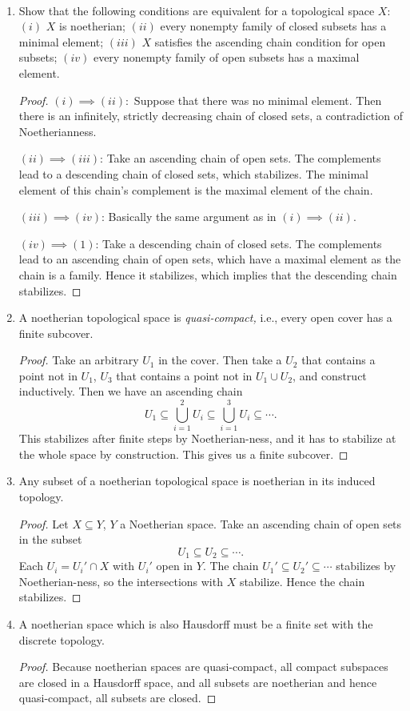 \begin{exercise}%
~
\begin{enumerate}
\item Show that the following conditions are equivalent for a topological space $X$: $(i)$ $X$ is noetherian; $(ii)$ every nonempty family of closed subsets has a minimal element; $(iii)$ $X$ satisfies the ascending chain condition for open subsets; $(iv)$ every nonempty family of open subsets has a maximal element.
\begin{proof}
	$(i)\implies (ii):$ Suppose that there was no minimal element.
	Then there is an infinitely, strictly decreasing chain of closed sets, a contradiction of Noetherianness.

	$(ii) \implies (iii) $: Take an ascending chain of open sets.
	The complements lead to a descending chain of closed sets, which stabilizes.
	The minimal element of this chain's complement is the maximal element of the chain.

	$(iii)\implies (iv) $: Basically the same argument as in $(i)\implies (ii) $.

	$(iv)\implies (1) $: Take a descending chain of closed sets.
	The complements lead to an ascending chain of open sets, which have a maximal element as the chain is a family.
	Hence it stabilizes, which implies that the descending chain stabilizes.
\end{proof}
\item A noetherian topological space is \emph{quasi-compact,} i.e., every open cover has a finite subcover.
\begin{proof}
	Take an arbitrary $U_{1} $ in the cover.
	Then take a $U_{2} $ that contains a point not in $U_{1} $, $U_{3} $ that contains a point not in $U_{1}\cup U_{2} $, and construct inductively.
	Then we have an ascending chain
	\[
		U_{1} \subseteq \bigcup_{i=1}^2 U_i \subseteq \bigcup_{i=1}^3 U_i \subseteq \cdots
	.\] 
	This stabilizes after finite steps by Noetherian-ness, and it has to stabilize at the whole space by construction.
	This gives us a finite subcover.
\end{proof}
\item Any subset of a noetherian topological space is noetherian in its induced topology.
\begin{proof}
	Let $X\subseteq Y $, $Y $ a Noetherian space.
	Take an ascending chain of open sets in the subset
	\[
		U_{1} \subseteq U_{2} \subseteq \cdots
	.\]
	Each $U_{i} = U_i' \cap X$ with $U_i' $ open in $Y $.
	The chain $U_{1}' \subseteq U_{2}' \subseteq \cdots $ stabilizes by Noetherian-ness, so the intersections with $X $ stabilize.
	Hence the chain stabilizes.
\end{proof}
\item A noetherian space which is also Hausdorff must be a finite set with the discrete topology.    
\begin{proof}
	Because noetherian spaces are quasi-compact, all compact subspaces are closed in a Hausdorff space, and all subsets are noetherian and hence quasi-compact, all subsets are closed.
\end{proof}
\end{enumerate}
\end{exercise}

